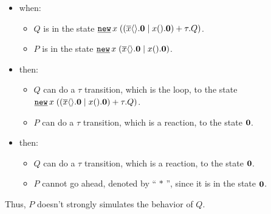 \begin{itemize}
\item when:
	\begin{itemize}
	\item $Q$ is in the state $\procres{x}{(\procchoice{(\procpar{\out{x}{}.\proczero}{\inp{x}{}.\proczero})}{\tau.Q})}$.
	\item $P$ is in the state $\procres{x}{(\procpar{\out{x}{}.\proczero}{\inp{x}{}.\proczero})}$.
	\end{itemize}

\item then:
	\begin{itemize}
	\item $Q$ can do a $\tau$ transition, which is the loop, to the state $\procres{x}{(\procchoice{(\\\procpar{\out{x}{}.\proczero}{\inp{x}{}.\proczero})}{\tau.Q})}$.
	\item $P$ can do a $\tau$ transition, which is a reaction, to the state $\mathbf{0}$.
	\end{itemize}

\item then:
	\begin{itemize}
	\item $Q$ can do a $\tau$ transition, which is a reaction, to the state $\mathbf{0}$.
	\item $P$ cannot go ahead, denoted by `` $*$ '', since it is in the state $\mathbf{0}$.
	\end{itemize}
\end{itemize}


Thus, $P$ doesn't strongly simulates the behavior of $Q$.

